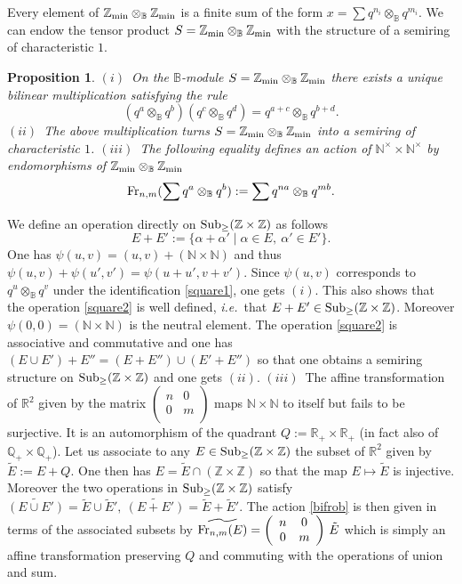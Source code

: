 \documentclass[noams,lp]{compositio}
\newtheorem{prop}[thm]{Proposition}
\def\B{{\mathbb B}}
\def\N{{\mathbb N}}
\def\Q{{\mathbb Q}}
\def\R{{\mathbb R}}
\def\Z{{\mathbb Z}}
\def\sub{{\rm Sub}_\geq}
\newcommand{\ie}{{\it i.e.\/}\ }
\def\zmin{\Z_{\rm min}}
\def\fr{{\rm Fr}}
\begin{document}
Every element of $\zmin\otimes_\B \zmin$ is a finite sum of the form
$
x=\sum q^{n_i}\otimes_\B q^{m_i}
$.
 We can endow the tensor product $S=\zmin\otimes_\B \zmin$ with the structure of a semiring of characteristic $1$. 
\begin{prop}\label{tensring} 
$(i)$~On the $\B$-module  $S=\zmin\otimes_\B \zmin$ there exists a unique bilinear multiplication satisfying the rule 
\begin{equation}\label{square3}
(q^ a\otimes_\B q^b)(q^ c\otimes_\B q^d)=q^ {a+c}\otimes_\B q^{b+d}.
\end{equation} 
$(ii)$~The above multiplication turns $S=\zmin\otimes_\B \zmin$ into a semiring of characteristic $1$.\newline
$(iii)$~The following equality defines an action of $\N^\times\times \N^\times$  by endomorphisms of $\zmin\otimes_\B \zmin$
\begin{equation}\label{bifrob}
\fr_{n,m}(\sum q^a\otimes_\B q^b):=\sum q^{na}\otimes_\B q^{mb}.
\end{equation}
\end{prop}
\proof We define an operation directly on $\sub(\Z\times \Z)$ as follows
\begin{equation}\label{square2}
E +E':=\{\alpha+\alpha' \mid \alpha \in E, \  \alpha' \in E'\}.
\end{equation}
One has $\psi(u,v)=(u,v)+(\N\times \N)$ and thus 
$
\psi(u,v)+\psi(u',v')=\psi(u+u',v+v')
$. 
Since $\psi(u,v)$ corresponds to $q^ u\otimes_\B q^v$ under the identification \eqref{square1}, one gets $(i)$. This also shows that the operation \eqref{square2} is well defined, \ie that $E +E'\in \sub(\Z\times \Z)$.
Moreover $\psi(0,0)=(\N \times \N)$ is the neutral element. The operation \eqref{square2} is associative and commutative and one has $(E \cup E')+E''=(E+E'')\cup(E'+E'')$ so that one obtains a semiring structure on 
$\sub(\Z\times \Z)$ and one gets $(ii)$.\newline
$(iii)$~The affine transformation of $\R^2$ given by the matrix $\left(
\begin{array}{cc}
 n & 0 \\
 0 & m \\
\end{array}
\right)$ maps $\N\times\N$ to itself but fails to be surjective. It is an automorphism of the quadrant $Q:=\R_+\times \R_+$ (in fact also of $\Q_+\times \Q_+$). Let us associate to any $E\in \sub(\Z\times\Z)$ the subset of  $\R^2$ given by $\tilde E:=E+Q$. One then has $E=\tilde E\cap (\Z\times \Z)$  so that the map $E\mapsto\tilde E$ is injective. Moreover the two operations in $\sub(\Z\times\Z)$ satisfy
$
\widetilde{ (E\cup E')}=\tilde E \cup \tilde E', ~ \widetilde{ (E+ E')}=\tilde E + \tilde E'
$.
 The action \eqref{bifrob} is then given in terms of the associated subsets by 
$
\widetilde{\fr_{n,m}(E)}=\left(
\begin{array}{cc}
 n & 0 \\
 0 & m \\
\end{array}
\right)\, \tilde E
$
which is simply an affine transformation preserving $Q$ and commuting with the operations of union and sum.
 \endproof
\end{document}
